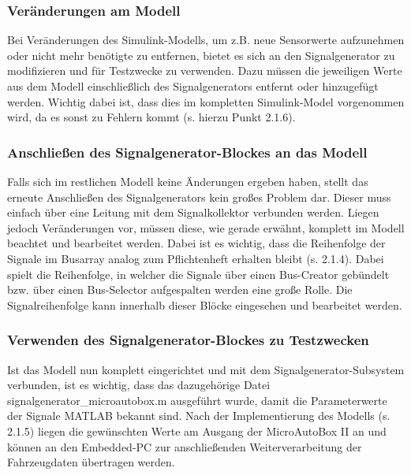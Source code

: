 \documentclass[fontsize = 12pt, paper = a4]{scrreprt}
\begin{document}
\subsubsection{Veränderungen am Modell} 

Bei Veränderungen des Simulink-Modells, um z.B. neue Sensorwerte aufzunehmen oder nicht mehr benötigte zu entfernen, bietet es sich an den Signalgenerator zu modifizieren und für Testzwecke zu verwenden. Dazu müssen die jeweiligen Werte aus dem Modell einschließlich des Signalgenerators entfernt oder hinzugefügt werden. Wichtig dabei ist, dass dies im kompletten Simulink-Model vorgenommen wird, da es sonst zu Fehlern kommt (s. hierzu Punkt 2.1.6). 


\subsubsection{Anschließen des Signalgenerator-Blockes an das Modell}

Falls sich im restlichen Modell keine Änderungen ergeben haben, stellt das erneute Anschließen des Signalgenerators kein großes Problem dar. 
Dieser muss einfach über eine Leitung mit dem Signalkollektor verbunden werden.  
Liegen jedoch Veränderungen vor, müssen diese, wie gerade erwähnt, komplett im Modell beachtet und bearbeitet werden. 
Dabei ist es wichtig, dass die Reihenfolge der Signale im Busarray analog zum Pflichtenheft erhalten bleibt (s. 2.1.4). 
Dabei spielt die Reihenfolge, in welcher die Signale über einen Bus-Creator gebündelt bzw. über einen Bus-Selector aufgespalten werden eine große Rolle. 
Die Signalreihenfolge kann innerhalb dieser Blöcke eingesehen und bearbeitet werden. 


\subsubsection{Verwenden des Signalgenerator-Blockes zu Testzwecken}

Ist das Modell nun komplett eingerichtet und mit dem Signalgenerator-Subsystem verbunden, ist es wichtig, dass das dazugehörige Datei signalgenerator\_microautobox.m ausgeführt wurde, damit die Parameterwerte der Signale MATLAB bekannt sind. Nach der Implementierung des Modells (s. 2.1.5) liegen die gewünschten Werte am Ausgang der MicroAutoBox II an und können an den Embedded-PC zur anschließenden Weiterverarbeitung der Fahrzeugdaten übertragen werden.


\end{document}
